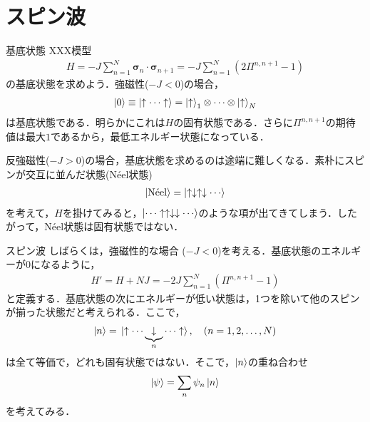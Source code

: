 \documentclass[dvipdfmx,9pt]{beamer}
\numberwithin{equation}{section}
\begin{document}
\section{スピン波}

\begin{frame}{基底状態}
    XXX模型
    \begin{align}
        H = -J\sum_{n=1}^N \bm{\sigma}_n\cdot \bm{\sigma}_{n+1} = -J \sum_{n=1}^N (2\Pi^{n,n+1}-1)
    \end{align}
    の基底状態を求めよう．強磁性($-J < 0$)の場合，
    \begin{align}
        \ket{0} \equiv \ket{\uparrow \cdots \uparrow} = \ket{\uparrow}_1 \otimes \cdots \otimes \ket{\uparrow}_N
    \end{align}
    は基底状態である．明らかにこれは$H$の固有状態である．さらに$\Pi^{n,n+1}$の期待値は最大$1$であるから，最低エネルギー状態になっている．
    
    反強磁性($-J > 0$)の場合，基底状態を求めるのは途端に難しくなる．素朴にスピンが交互に並んだ状態(N\'eel状態)
    \begin{align}
        \ket{\textrm{N\'{e}el}} = \ket{\uparrow\downarrow\uparrow\downarrow \cdots}
    \end{align}
    を考えて，$H$を掛けてみると，$\ket{\cdots \uparrow\uparrow\downarrow\downarrow \cdots}$のような項が出てきてしまう．したがって，N\'eel状態は固有状態ではない．
\end{frame} 

\begin{frame}{スピン波}
    しばらくは，強磁性的な場合 ($-J<0$)を考える．基底状態のエネルギーが$0$になるように，
    \begin{align}
        H' = H + NJ = -2J \sum_{n=1}^N (\Pi^{n,n+1}-1)
    \end{align}
    と定義する．基底状態の次にエネルギーが低い状態は，1つを除いて他のスピンが揃った状態だと考えられる．ここで，
    \begin{align}
        \ket{n} = \ket*{\uparrow \cdots \underbrace{\downarrow}_n\cdots\uparrow},
        \quad (n=1,2,\ldots,N)
    \end{align}
    は全て等価で，どれも固有状態ではない．そこで，$\ket{n}$の重ね合わせ
    \begin{align}
        \ket{\psi} = \sum_n \psi_n \ket{n}
    \end{align}
    を考えてみる．
\end{frame}
\end{document}
